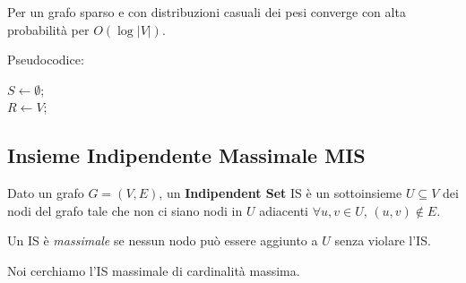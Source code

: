 Per un grafo sparso e con distribuzioni casuali dei pesi converge con alta probabilità per $O(\log |V|)$.

Pseudocodice:
\begin{center}
    \begin{minipage}{.7\textwidth}
        \begin{tcolorbox}[
            colback=white,
            sharp corners,
            boxrule=.3mm,
            left=20pt,
            top=0pt,
            bottom=0pt,
            colbacktitle=white,
            coltitle=black
            ]
            \LinesNumbered
            \begin{algorithm}[H]
                \SetAlgoNoEnd
                $S \leftarrow \emptyset$; \\
                $R \leftarrow V$;  \\
            \end{algorithm}
        \end{tcolorbox}
    \end{minipage}
\end{center}

\subsection{Insieme Indipendente Massimale MIS}

Dato un grafo $G = (V,E)$, un \textbf{Indipendent Set} IS è un sottoinsieme $U \subseteq V$ dei nodi del grafo tale che non ci siano nodi in $U$ adiacenti $\forall u,v \in U$, $(u,v) \notin E$.

Un IS è \textit{massimale} se nessun nodo può essere aggiunto a $U$ senza violare l'IS.

Noi cerchiamo l'IS massimale di cardinalità massima.

